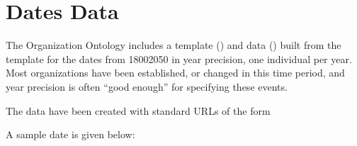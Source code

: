 \documentclass[letterpaper,10pt,english]{sphinxmanual}
\begin{document}
\chapter{Dates Data}
\label{\detokenize{data-dates:dates-data}}\label{\detokenize{data-dates:index-0}}\label{\detokenize{data-dates::doc}}
\sphinxAtStartPar
The Organization Ontology includes a template () and
data () built from the template for the dates
from 1800\sphinxhyphen{}2050 in year precision, one individual per year.  Most organizations have been
established, or changed in this time
period, and year precision is often “good enough” for specifying these events.

\sphinxAtStartPar
The data have been created with standard URLs of the form

\begin{sphinxVerbatim}[commandchars=\\\{\}]
\end{sphinxVerbatim}

\sphinxAtStartPar
A sample date is given below:

\begin{sphinxVerbatim}[commandchars=\\\{\}]
      
\end{sphinxVerbatim}
\end{document}
